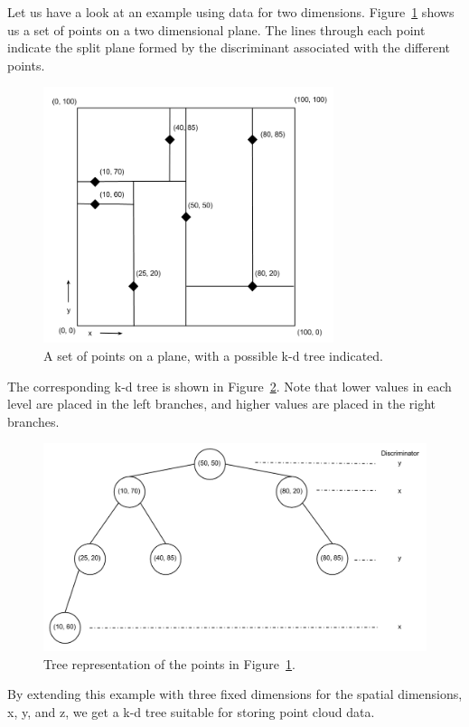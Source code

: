 Let us have a look at an example using data for two dimensions. Figure~\ref{fig:kd_tree_2d_plane} shows us a set of points on a two dimensional plane. The lines through each point indicate the split plane formed by the discriminant associated with the different points.

\begin{figure}[ht!]
    \centering
    \includegraphics[width=85mm]{../gfx/kd_tree_illustration_graph.png}
    \caption{A set of points on a plane, with a possible k-d tree indicated.}
    \label{fig:kd_tree_2d_plane}
\end{figure}

The corresponding k-d tree is shown in Figure~\ref{fig:kd_tree_2d}. Note that lower values in each level are placed in the left branches, and higher values are placed in the right branches.

\begin{figure}[ht!]
    \centering
    \includegraphics[width=120mm]{../gfx/kd_tree_illustration_tree.png}
    \caption{Tree representation of the points in Figure~\ref{fig:kd_tree_2d_plane}.}
    \label{fig:kd_tree_2d}
\end{figure}

By extending this example with three fixed dimensions for the spatial dimensions, x, y, and z, we get a k-d tree suitable for storing point cloud data.

